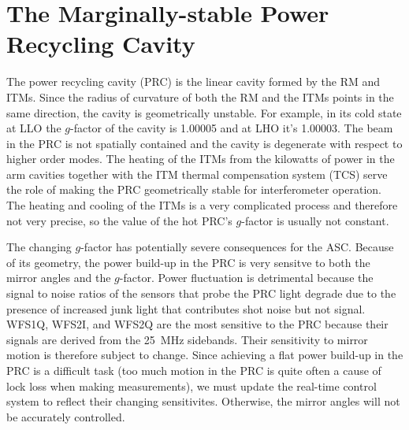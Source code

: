 \section{The Marginally-stable Power Recycling Cavity}
The power recycling cavity (PRC) is the linear cavity formed by the RM
and ITMs. Since the radius of curvature of both the RM and the ITMs
points in the same direction, the cavity is geometrically
unstable. For example, in its cold state at LLO the $g$-factor of the
cavity is 1.00005 and at LHO it's 1.00003. The beam in the PRC is not
spatially contained and the cavity is degenerate with respect to
higher order modes. The heating of the ITMs from the kilowatts of
power in the arm cavities together with the ITM thermal compensation
system (TCS) serve the role of making the PRC geometrically stable for
interferometer operation. The heating and cooling of the ITMs is a
very complicated process and therefore not very precise, so the value
of the hot PRC's $g$-factor is usually not constant.

The changing $g$-factor has potentially severe consequences
for the ASC. Because of its geometry, the power build-up in the PRC is
very sensitve to both the mirror angles and the $g$-factor. Power
fluctuation is detrimental because the signal to noise ratios of the
sensors that probe the PRC light degrade due to the presence of
increased junk light that contributes shot noise but not
signal. WFS1Q, WFS2I, and WFS2Q are the most sensitive to the PRC
because their signals are derived from the 25~MHz sidebands. Their
sensitivity to mirror motion is therefore subject to change. Since
achieving a flat power build-up in the PRC is a difficult task (too
much motion in the PRC is quite often a cause of lock loss when making
measurements), we must update the real-time control system to reflect
their changing sensitivites. Otherwise, the mirror angles will not be
accurately controlled.

